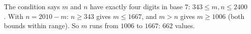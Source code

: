 The condition says $m$ and $n$ have exactly four digits in base $7$: $343\le m,n\le2400$. With $n=2010-m$: $n\ge343$ gives $m\le1667$, and $m>n$ gives $m\ge1006$ (both bounds within range). So $m$ runs from $1006$ to $1667$: $\boxed{662}$ values.
